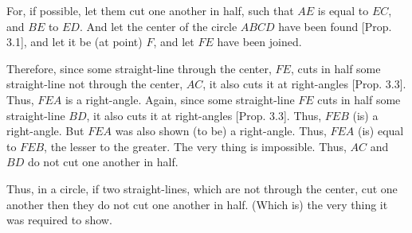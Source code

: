 \begin{Parallel}{}{}
{For, if possible, let them cut one another in half, such that $AE$ is equal to $EC$, and
$BE$ to $ED$. And let the center of the circle $ABCD$ have been found [Prop. 3.1], and let it be (at point) $F$, and let $FE$ have been joined.

Therefore, since some straight-line through the center, $FE$, cuts in half
some straight-line not through the center, $AC$, it also cuts it at right-angles
[Prop. 3.3]. Thus, $FEA$ is a right-angle. Again, since some straight-line
$FE$ cuts in half some straight-line $BD$, it also cuts it at right-angles [Prop. 3.3]. Thus, $FEB$ (is) a right-angle. But $FEA$ was also shown (to be) a right-angle. Thus, $FEA$ (is) equal to $FEB$, the lesser to the greater.
The very thing is impossible. Thus, $AC$ and $BD$ do not cut one another in half.

\epsfysize=2in
\centerline{}

Thus, in a circle, if two straight-lines, which are not through the center, cut
one another then they do not cut one another in half. (Which is) the very
thing it was required to show.}
\end{Parallel}

